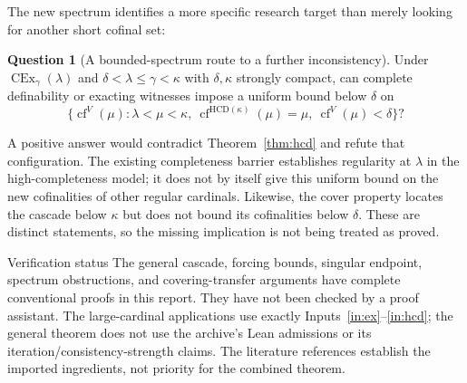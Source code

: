 \documentclass[11pt,letterpaper]{article}
\theoremstyle{definition}
\newtheorem{question}[definition]{Question}
\numberwithin{equation}{section}
\newcommand{\HCD}{\mathrm{HCD}}
\newcommand{\cf}{\operatorname{cf}}
\newcommand{\CEx}{\operatorname{CEx}}
\begin{document}
The new spectrum identifies a more specific research target than merely looking for another short cofinal set:

\begin{question}[A bounded-spectrum route to a further inconsistency]
Under $\CEx_\gamma(\lambda)$ and $\delta<\lambda\le\gamma<\kappa$ with $\delta,\kappa$ strongly compact, can complete definability or exacting witnesses impose a uniform bound below $\delta$ on
\[
\{\cf^V(\mu):\lambda<\mu<\kappa,\
\cf^{\HCD(\kappa)}(\mu)=\mu,\
\cf^V(\mu)<\delta\}?
\]
\end{question}

A positive answer would contradict Theorem~\ref{thm:hcd} and refute that configuration. The existing completeness barrier establishes regularity at $\lambda$ in the high-completeness model; it does not by itself give this uniform bound on the new cofinalities of other regular cardinals. Likewise, the cover property locates the cascade below $\kappa$ but does not bound its cofinalities below $\delta$. These are distinct statements, so the missing implication is not being treated as proved.

\begin{assessment}{Verification status}
The general cascade, forcing bounds, singular endpoint, spectrum obstructions, and covering-transfer arguments have complete conventional proofs in this report. They have not been checked by a proof assistant. The large-cardinal applications use exactly Inputs~\ref{in:ex}--\ref{in:hcd}; the general theorem does not use the archive's Lean admissions or its iteration/consistency-strength claims. The literature references establish the imported ingredients, not priority for the combined theorem.
\end{assessment}
\end{document}

